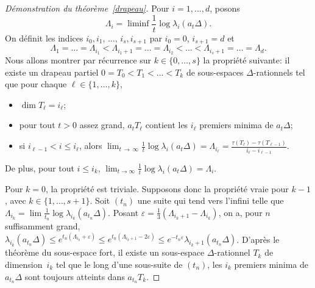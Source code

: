 \documentclass[AHL,Unicode,longabstracts,francais,published]{cedram}
\newcommand{\se}[2]{\{#1,\dots,#2\}}
\newcommand{\eps}{\varepsilon}
\begin{document}
\begin{proof}[Démonstration du théorème~\ref{drapeau}]
Pour $i=1,\dots,d$, posons 
\[
\Lambda_i=\liminf \frac{1}{t}\log\lambda_i\left(a_t\Delta\right).
\]
On définit les indices $i_0,i_1,\,\dots,\,i_s,i_{s+1}$ par $i_0=0$, $i_{s+1}=d$ et
\[
\Lambda_1=\dots=\Lambda_{i_1}<\Lambda_{i_1+1}=\dots=\Lambda_{i_2}<\dots<\Lambda_{i_s+1}=\dots=\Lambda_d.
\]
Nous allons montrer par récurrence sur $k\in\se{0}{s}$ la propriété suivante: il existe un drapeau partiel $0=T_0<T_1<\dots<T_k$ de sous-espaces $\Delta$-rationnels tel que pour chaque $\ell\in\se{1}{k}$,
\begin{itemize}
\item $\dim T_\ell = i_\ell$;
\item pour tout $t>0$ assez grand, $a_tT_\ell$ contient les $i_\ell$ premiers minima de $a_t\Delta$;
\item si $i_{\ell-1}<i\leq i_\ell$, alors $\lim_{t\,\to\,\infty}\frac{1}{t}\log\lambda_i(a_t\Delta)=\Lambda_{i_\ell} = \frac{\tau(T_\ell)-\tau(T_{\ell-1})}{i_\ell-i_{\ell-1}}$.
\end{itemize}
De plus, pour tout $i\leq i_k$, $\lim_{t\to\infty}\frac{1}{t}\log\lambda_i(a_t\Delta)=\Lambda_i$.

Pour $k=0$, la propriété est triviale. Supposons donc la propriété vraie pour $k-1$, avec $k\in\se{1}{s+1}$. Soit $(t_n)$ une suite qui tend vers l'infini telle que $\Lambda_{i_k}=\lim\frac{1}{t_n}\log\lambda_{i_k}(a_{t_n}\Delta)$. Posant $\eps=\frac{1}{3}(\Lambda_{i_k+1}-\Lambda_{i_k})$, on a, pour $n$ suffisamment grand, $\lambda_{i_k}(a_{t_n}\Delta)\leq e^{t_n(\Lambda_{i_k}+\eps)}
\leq e^{t_n(\Lambda_{i_k+1}-2\eps)}
\leq e^{-t_n\eps}\lambda_{i_k+1}(a_{t_n}\Delta)$. D'après le théorème du sous-espace fort, il existe un sous-espace $\Delta$-rationnel $T_k$ de dimension~$i_k$ tel que le long d'une sous-suite de $(t_n)$, les $i_k$ premiers minima de $a_{t_n}\Delta$ sont toujours atteints dans $a_{t_n}T_k$.


\end{proof}
\end{document}
